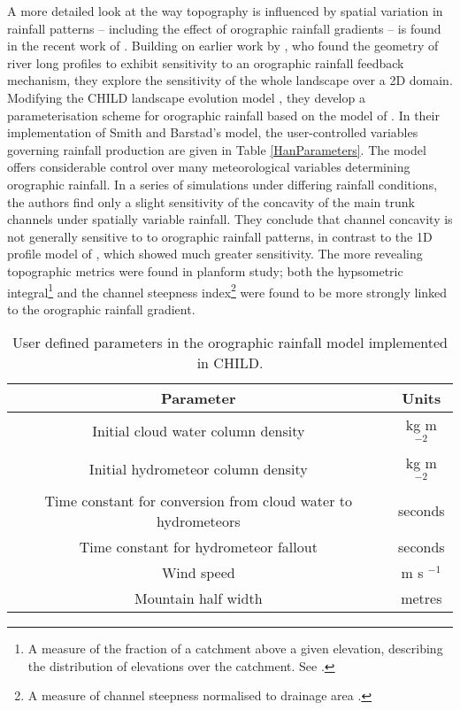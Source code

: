 A more detailed look at the way topography is influenced by spatial variation in rainfall patterns -- including the effect of orographic rainfall gradients -- is found in the recent work of \cite{han2015measuring}. Building on earlier work by \citet{Roe2002}, who found the geometry of river long profiles to exhibit sensitivity  to an orographic rainfall feedback mechanism, they explore the sensitivity of the whole landscape over a 2D domain. Modifying the CHILD landscape evolution model \citep{Tucker2001}, they develop a parameterisation scheme for orographic rainfall based on the model of \citet{smith2004linear}. In their implementation of Smith and Barstad's model, the user-controlled variables governing rainfall production are given in Table \ref{HanParameters}. The model offers considerable control over many meteorological variables determining orographic rainfall. In a series of simulations under differing rainfall conditions, the authors find only a slight sensitivity of the concavity of the main trunk channels under spatially variable rainfall. They conclude that channel concavity is not generally sensitive to to orographic rainfall patterns, in contrast to the 1D profile model of \citet{Roe2002}, which showed much greater sensitivity. The more revealing topographic metrics were found in planform study; both the hypsometric integral\footnote{A measure of the fraction of a catchment above a given elevation, describing the distribution of elevations over the catchment. See \citet{brocklehurst2004hypsometry,cohen2008methodology}.} and the channel steepness index\footnote{A measure of channel steepness normalised to drainage area \citep{wobus2006tectonics}.} were found to be more strongly linked to the orographic rainfall gradient. 

\label{HanParameters}
\begin{table}
\begin{tabular}{|c|c|}
\hline 
\textbf{Parameter} & \textbf{Units}  \\ 
\hline 
Initial cloud water column density & kg m \(^{-2}\) \\ 
\hline 
Initial hydrometeor column density & kg m \(^{-2}\) \\ 
\hline 
Time constant for conversion from cloud water to hydrometeors & seconds \\ 
\hline 
Time constant for hydrometeor fallout & seconds \\ 
\hline 
Wind speed & m s \(^{-1}\) \\ 
\hline 
Mountain half width & metres \\ 
\hline 
\end{tabular} 
\caption{User defined parameters in the \citet{han2015measuring} orographic rainfall model implemented in CHILD.}
\end{table}

